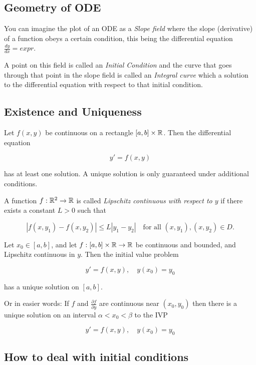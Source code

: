 \subsection{Geometry of ODE}

You can imagine the plot of an ODE as a \emph{Slope field} where the slope (derivative) of a function
obeys a certain condition, this being the differential equation \(\frac{dy}{dx} = expr\).

A point on this field is called an \emph{Initial Condition} and the curve that goes through
that point in the slope field is called an \emph{Integral curve} which a solution to the differential
equation with respect to that initial condition.

\subsection{Existence and Uniqueness}

Let \( f(x, y) \) be continuous on a rectangle \( [a, b] \times \mathbb{R} \). Then the differential 
equation

\[
    y' = f(x, y)
\]

has at least one solution. A unique solution is only guaranteed under additional conditions.

A function \( f : \mathbb{R}^2 \to \mathbb{R} \) is called 
\emph{Lipschitz continuous with respect to \(y\)} if there exists a constant \( L > 0 \) such that

\[
    |f(x, y_1) - f(x, y_2)| \leq L |y_1 - y_2|
    \quad \text{for all } (x, y_1), (x, y_2) \in D.
\]

Let \( x_0 \in [a, b] \), and let \( f : [a, b] \times \mathbb{R} \to \mathbb{R} \) be continuous 
and bounded, and Lipschitz continuous in \(y\). Then the initial value problem

\[
    y' = f(x, y), \quad y(x_0) = y_0
\]

has a unique solution on \( [a, b] \).

Or in easier words: If \(f\) and \(\frac{\partial f}{\partial y}\) are continuous near \((x_0, y_0)\) 
then there is a unique solution on an interval \(\alpha < x_0 < \beta\) to the IVP

\[
    y' = f(x,y), \quad y(x_0) = y_0
\]

\subsection{How to deal with initial conditions}

